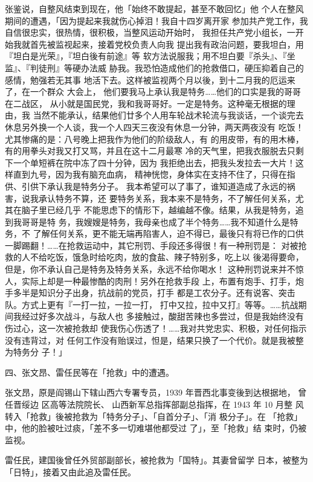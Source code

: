 张鉴说，自整风结束到现在，他「始终不敢提起，甚至不敢回忆」他
个人在整风期间的遭遇，「因为提起来我就伤心掉泪！我自十四岁离开家
参加共产党工作，我自信很忠实，很热情，很积极，当整风运动开始时，
我担任共产党小组长，一开始我就首先被监视起来，接着党校负责人向我
提出我有政治问题，要我坦白，用『坦白是光荣』，『坦白後有前途』等
软方法说服我；用不坦白要『杀头』、『坐监』、『判徒刑』等硬办法威
胁我。我恐怕造成他们的抢救借口，硬压抑着自己的感情，勉强若无其事
地活下去。这样被监视两个月以後，到十二月我的厄运来了，在一个群众
大会上，
他们要我马上承认我是特务……他们的口实是我的哥哥在二战区，
从小就是国民党，我和我哥哥好。一定是特务。这种毫无根据的理由，我
当然不能承认，结果他们廿多个人用车轮战术轮流与我谈话，一个谈完去
休息另外换一个人谈，我一个人四天三夜没有休息一分钟，两天两夜没有
吃饭！尤其惨痛的是：八号晚上把我作为他们的阶级敌人，有
的用皮带，有的用木棒，有的用拳头对我又打又骂，并且在这十二月最寒
冷的天气里，把我衣服脱去只剩下一个单短裤在院中冻了四十分钟，因为
我拒绝出去，把我头发拉去一大片！这样直到九号，因为我有脑充血病，
精神恍惚，身体实在支持不住了，只得在指供、引供下承认我是特务分子。
我本希望可以了事了，谁知道造成了永远的祸害，说我承认特务不算，还
要特务关系，我本来不是特务，不了解任何关系，尤其在脑子里已经几乎
不能思虑下的情形下，越编越不像。结果，从我是特务，追到我哥哥是特
务，我嫂嫂是特务，我母亲也成了半个特务……我不知道什么是特务，不
了解任何关系，更不能无端再陷害人，迫不得已，最後只有将已作的口供
一脚踢翻！……在抢救运动中，其它刑罚、手段还多得很！有一种刑罚是：
对被抢救的人不给吃饭，饿急时给吃肉，放的食盐、辣子特别多，吃上以
後渴得要命，但是，你不承认自己是特务及特务关系，永远不给你喝水！
这种刑罚说来并不惊人，实际上却是一种最惨酷的肉刑！另外在抢救手段
上，布置有炮手、打手，炮手多半是知识分子出身，抗战前的党员，打手
都是工农分子。还有说客、突击队。方式上更有『一打一拉，一拉一打，
打中又拉，拉中又打』等等。……抗战期间我经过好多次战斗，与敌人也
多接触过，酸甜苦辣也多尝过，但是我始终没有伤过心，这一次被抢救却
使我伤心伤透了！……我对共党忠实、积极，对任何指示没有违背过，对
任何工作没有贻误过，怛是，结果只换了一个代价。就是我被整为特务分
子！」

四、张文昂、雷任民等在「抢救」中的遭遇。

张文昂，原是阎锡山下辖山西六专署专员，1939 年晋西北事变後到达根据地， 曾任晋绥边
区高等法院院长、 山西新军总指挥部副总指挥，在  1943  年 10 月整
风转入「抢救」後被抢救为「特务分子」、「自首分子」、「消 极分子」。在
「抢救」中，他的脸被吐过痰，「差不多一切难堪他都受过 了」，至「抢救」结
束时，仍被监视。

雷任民，建国後曾任外贸部副部长，被抢救为「国特」。其妻曾留学
日本，被整为「日特」，接着又由此追及雷任民。

